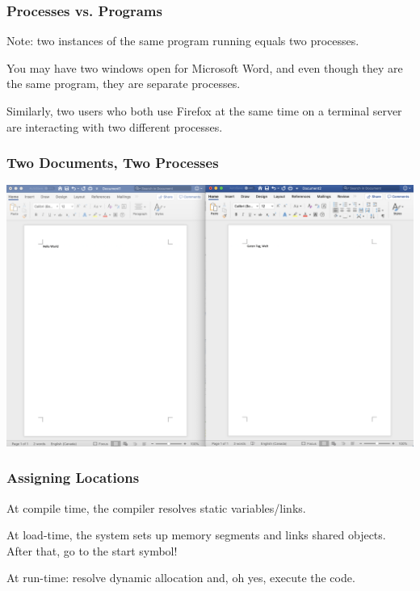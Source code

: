 \begin{frame}
	\frametitle{Processes vs. Programs}

	Note: two instances of the same program running equals two processes.

	You may have two windows open for Microsoft Word, and even though they are the same program, they are separate processes.


	Similarly, two users who both use Firefox at the same time on a terminal server are interacting with two different processes.

\end{frame}


\begin{frame}
	\frametitle{Two Documents, Two Processes}

	\begin{center}
		\includegraphics[width=\textwidth]{images/2docs.png}
	\end{center}


\end{frame}

\begin{frame}
\frametitle{Assigning Locations}

At compile time, the compiler resolves static variables/links.

At load-time, the system sets up memory segments and links shared objects.\\
\quad After that, go to the start symbol!

At run-time: resolve dynamic allocation and, oh yes, execute the code.

\end{frame}

